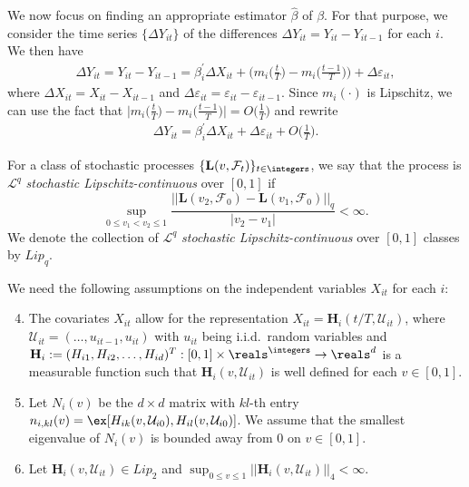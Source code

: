 We now focus on finding an appropriate estimator $\widehat{\beta}$ of $\beta$. For that purpose, we consider the time series $\{\Delta Y_{it}\}$ of the differences $\Delta Y_{it} = Y_{it} - Y_{i t-1}$ for each $i$. We then have
\begin{align*}
	\Delta Y_{it} = Y_{it} - Y_{i t-1} =\beta_i^\prime \Delta X_{it} + \bigg(m_i \Big( \frac{t}{T} \Big) - m_i \Big(\frac{t-1}{T}\Big)\bigg) + \Delta \varepsilon_{it},
\end{align*}
where $\Delta X_{it} = X_{it} - X_{it-1}$ and $ \Delta \varepsilon_{it} = \varepsilon_{it} - \varepsilon_{i t-1}$. Since $m_i(\cdot)$ is Lipschitz, we can use the fact that $ \big|m_i \big( \frac{t}{T} \big) - m_i \big(\frac{t-1}{T}\big) \big| = O\big(\frac{1}{T}\big)$ and rewrite 
\begin{align*}
	\Delta Y_{it} = \beta_i^\prime \Delta X_{it} + \Delta \varepsilon_{it} + O\Big(\frac{1}{T}\Big).
\end{align*}

For a class of stochastic processes $\{\mathbf{L}(v, \mathcal{F}_t)\}_{t\in\integers}$, we say that the process is $\mathcal{L}^q$ \textit{stochastic Lipschitz-continuous} over $[0,1]$ if
\[ \sup_{0\leq v_1 < v_2 \leq 1} \frac{||\mathbf{L}(v_2, \mathcal{F}_0) - \mathbf{L}(v_1, \mathcal{F}_0)||_q}{|v_2 - v_1|} < \infty.
\]
We denote the collection of $\mathcal{L}^q$ \textit{stochastic Lipschitz-continuous} over $[0,1]$ classes by $Lip_q$.

We need the following assumptions on the independent variables $X_{it}$ for each $i$:

\begin{enumerate}[label=(C\arabic*),leftmargin=1.05cm]
\setcounter{enumi}{3}

\item \label{C-reg1} The covariates $X_{it}$ allow for the representation $X_{it} = \mathbf{H}_i(t/T, \mathcal{U}_{it})$, where $\mathcal{U}_{it} =(\ldots,u_{it-1},u_{it})$ with $u_{it}$ being i.i.d.\ random variables and $\mathbf{H}_i := (H_{i1}, H_{i2}, \ldots, H_{id})^T: [0, 1] \times \reals^\integers \rightarrow \reals^d$ is a measurable function such that $\mathbf{H}_i(v, \mathcal{U}_{it})$ is well defined for each $v\in [0,1]$. 

\item \label{C-reg2} Let $N_i(v)$ be the $d\times d$ matrix with $kl$-th entry $n_{i, kl}(v) = \ex[H_{ik}(v, \mathcal{U}_{i0}), H_{il}(v, \mathcal{U}_{i0})]$. We assume that the smallest eigenvalue of $N_i(v)$ is bounded away from $0$ on $v\in[0,1]$.

\item \label{C-reg3} Let $\mathbf{H}_{i}(v, \mathcal{U}_{it}) \in Lip_2$ and $\sup_{0\leq v\leq 1}||\mathbf{H}_{i}(v, \mathcal{U}_{it})||_4 <\infty$.
\end{enumerate}

